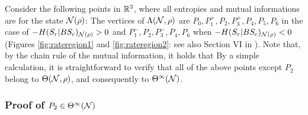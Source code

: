 \documentclass[journal]{IEEEtran}
\begin{document}
\begin{lmm}
\begin{lmm}
Consider the following points in ${\mathbb R}^3$,
where all entropies and mutual informations are for the state ${\mathcal N}(\rho)$:
The vertices of $\Lambda({\mathcal N},\rho)$ are $P_0,P_1^+,P_2,P_3^+,P_4,P_5,P_6$ in the case of $-H(S_r|BS_c)_{{\mathcal N}(\rho)}>0$ and $P_1^-,P_2,P_3^-,P_4,P_6$ when $-H(S_r|BS_c)_{{\mathcal N}(\rho)}<0$ (Figures \ref{fig:rateregion1} and \ref{fig:rateregion2}: see also Section VI in \cite{hsieh2010entanglement}).
Note that, by the chain rule of the mutual information, it holds that
By a simple calculation, it is straightforward to verify that all of the above points except $P_2$ belong to $\Theta({\mathcal N},\rho)$, and consequently to $\Theta^{\infty}({\mathcal N})$. 


 

\subsubsection{Proof of $P_2\in\Theta^{\infty}({\mathcal N})$}



\end{lmm}
\end{lmm}
\end{document}
